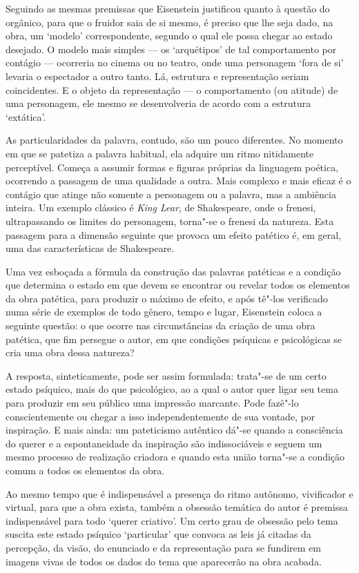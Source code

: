 Seguindo as mesmas premissas que Eisenstein justificou quanto à questão
do orgânico, para que o fruidor saia de si mesmo, é preciso que lhe seja
dado, na obra, um `modelo' correspondente, segundo o qual
ele possa chegar ao estado desejado. O modelo mais simples --- os
`arquétipos' de tal comportamento por contágio --- ocorreria no cinema
ou no teatro, onde uma personagem `fora de si' levaria o espectador a
outro tanto. Lá, estrutura e representação seriam coincidentes. E o
objeto da representação --- o comportamento (ou atitude) de uma
personagem, ele mesmo se desenvolveria de acordo com a estrutura
`extática'.

As particularidades da palavra, contudo, são um pouco diferentes. No
momento em que se patetiza a palavra habitual, ela adquire um ritmo
nitidamente perceptível. Começa a assumir formas e figuras próprias da
linguagem poética, ocorrendo a passagem de uma qualidade a outra. Mais
complexo e mais eficaz é o contágio que atinge não somente a personagem
ou a palavra, mas a ambiência inteira. Um exemplo clássico é \emph{King
Lear}, de Shakespeare, onde o frenesi, ultrapassando os limites do
personagem, torna"-se o frenesi da natureza. Esta passagem para a
dimensão seguinte que provoca um efeito patético é, em geral, uma das
características de Shakespeare.

Uma vez esboçada a fórmula da construção das palavras patéticas e a
condição que determina o estado em que devem se encontrar ou revelar
todos os elementos da obra patética, para produzir o máximo de efeito, e
após tê"-los verificado numa série de exemplos de todo gênero, tempo e
lugar, Eisenstein coloca a seguinte questão: o que ocorre nas
circunstâncias da criação de uma obra patética, que fim persegue o
autor, em que condições psíquicas e psicológicas se cria uma obra dessa
natureza?

A resposta, sinteticamente, pode ser assim formulada: trata"-se de um
certo estado psíquico, mais do que psicológico, ao a qual o autor quer
ligar seu tema para produzir em seu público uma impressão marcante. Pode
fazê"-lo conscientemente ou chegar a isso independentemente de sua
vontade, por inspiração. E mais ainda: um pateticismo autêntico dá"-se
quando a consciência do querer e a espontaneidade da inspiração são
indissociáveis e seguem um mesmo processo de realização criadora e
quando esta união torna"-se a condição comum a todos os elementos da
obra.

Ao mesmo tempo que é indispensável a presença do ritmo autônomo,
vivificador e virtual, para que a obra exista, também a obsessão
temática do autor é premissa indispensável para todo `querer criativo'.
Um certo grau de obsessão pelo tema suscita este estado psíquico
`particular' que convoca as leis já citadas da percepção, da visão, do
enunciado e da representação para se fundirem em imagens vivas de todos
os dados do tema que aparecerão na obra acabada.

